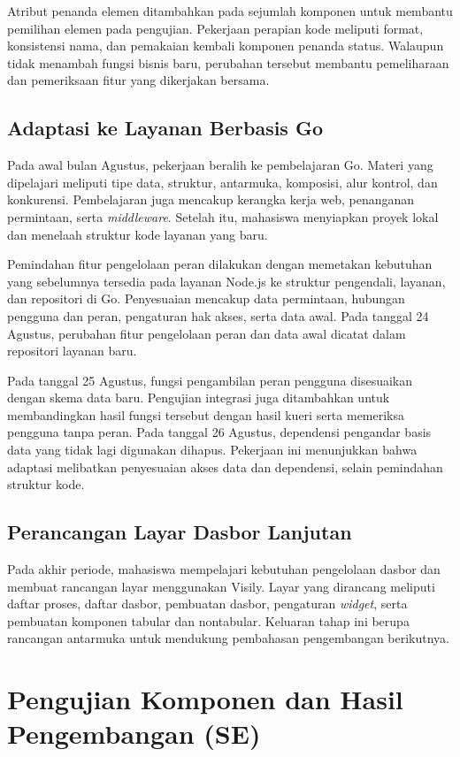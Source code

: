 Atribut penanda elemen ditambahkan pada sejumlah komponen untuk membantu pemilihan elemen pada pengujian. Pekerjaan perapian kode meliputi format, konsistensi nama, dan pemakaian kembali komponen penanda status. Walaupun tidak menambah fungsi bisnis baru, perubahan tersebut membantu pemeliharaan dan pemeriksaan fitur yang dikerjakan bersama.

\subsection{Adaptasi ke Layanan Berbasis Go}
Pada awal bulan Agustus, pekerjaan beralih ke pembelajaran Go. Materi yang dipelajari meliputi tipe data, struktur, antarmuka, komposisi, alur kontrol, dan konkurensi. Pembelajaran juga mencakup kerangka kerja web, penanganan permintaan, serta \textit{middleware}. Setelah itu, mahasiswa menyiapkan proyek lokal dan menelaah struktur kode layanan yang baru.

Pemindahan fitur pengelolaan peran dilakukan dengan memetakan kebutuhan yang sebelumnya tersedia pada layanan Node.js ke struktur pengendali, layanan, dan repositori di Go. Penyesuaian mencakup data permintaan, hubungan pengguna dan peran, pengaturan hak akses, serta data awal. Pada tanggal 24 Agustus, perubahan fitur pengelolaan peran dan data awal dicatat dalam repositori layanan baru.

Pada tanggal 25 Agustus, fungsi pengambilan peran pengguna disesuaikan dengan skema data baru. Pengujian integrasi juga ditambahkan untuk membandingkan hasil fungsi tersebut dengan hasil kueri serta memeriksa pengguna tanpa peran. Pada tanggal 26 Agustus, dependensi pengandar basis data yang tidak lagi digunakan dihapus. Pekerjaan ini menunjukkan bahwa adaptasi melibatkan penyesuaian akses data dan dependensi, selain pemindahan struktur kode.

\subsection{Perancangan Layar Dasbor Lanjutan}
Pada akhir periode, mahasiswa mempelajari kebutuhan pengelolaan dasbor dan membuat rancangan layar menggunakan Visily. Layar yang dirancang meliputi daftar proses, daftar dasbor, pembuatan dasbor, pengaturan \textit{widget}, serta pembuatan komponen tabular dan nontabular. Keluaran tahap ini berupa rancangan antarmuka untuk mendukung pembahasan pengembangan berikutnya.

\section{Pengujian Komponen dan Hasil Pengembangan (SE)}
